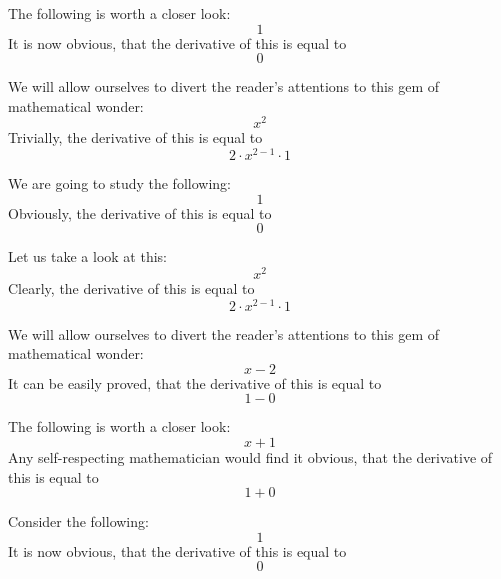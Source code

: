 \documentclass{article}
\begin{document}
The following is worth a closer look:
\begin{equation}
1 
\end{equation}
It is now obvious, that the derivative of this is equal to
\begin{equation}
0 
\end{equation}

We will allow ourselves to divert the reader's attentions to this gem of mathematical wonder:
\begin{equation}
x ^{2 } 
\end{equation}
Trivially, the derivative of this is equal to
\begin{equation}
2 \cdot x ^{2 - 1 } \cdot 1 
\end{equation}

We are going to study the following:
\begin{equation}
1 
\end{equation}
Obviously, the derivative of this is equal to
\begin{equation}
0 
\end{equation}

Let us take a look at this:
\begin{equation}
x ^{2 } 
\end{equation}
Clearly, the derivative of this is equal to
\begin{equation}
2 \cdot x ^{2 - 1 } \cdot 1 
\end{equation}

We will allow ourselves to divert the reader's attentions to this gem of mathematical wonder:
\begin{equation}
x - 2 
\end{equation}
It can be easily proved, that the derivative of this is equal to
\begin{equation}
1 - 0 
\end{equation}

The following is worth a closer look:
\begin{equation}
x + 1 
\end{equation}
Any self-respecting mathematician would find it obvious, that the derivative of this is equal to
\begin{equation}
1 + 0 
\end{equation}

Consider the following:
\begin{equation}
1 
\end{equation}
It is now obvious, that the derivative of this is equal to
\begin{equation}
0 
\end{equation}
\end{document}
